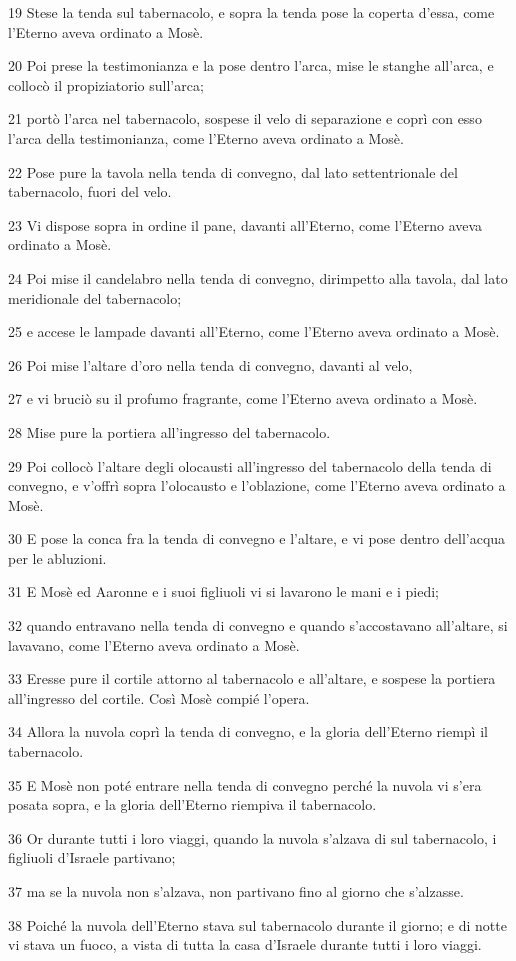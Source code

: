 \par 19 Stese la tenda sul tabernacolo, e sopra la tenda pose la coperta d'essa, come l'Eterno aveva ordinato a Mosè.
\par 20 Poi prese la testimonianza e la pose dentro l'arca, mise le stanghe all'arca, e collocò il propiziatorio sull'arca;
\par 21 portò l'arca nel tabernacolo, sospese il velo di separazione e coprì con esso l'arca della testimonianza, come l'Eterno aveva ordinato a Mosè.
\par 22 Pose pure la tavola nella tenda di convegno, dal lato settentrionale del tabernacolo, fuori del velo.
\par 23 Vi dispose sopra in ordine il pane, davanti all'Eterno, come l'Eterno aveva ordinato a Mosè.
\par 24 Poi mise il candelabro nella tenda di convegno, dirimpetto alla tavola, dal lato meridionale del tabernacolo;
\par 25 e accese le lampade davanti all'Eterno, come l'Eterno aveva ordinato a Mosè.
\par 26 Poi mise l'altare d'oro nella tenda di convegno, davanti al velo,
\par 27 e vi bruciò su il profumo fragrante, come l'Eterno aveva ordinato a Mosè.
\par 28 Mise pure la portiera all'ingresso del tabernacolo.
\par 29 Poi collocò l'altare degli olocausti all'ingresso del tabernacolo della tenda di convegno, e v'offrì sopra l'olocausto e l'oblazione, come l'Eterno aveva ordinato a Mosè.
\par 30 E pose la conca fra la tenda di convegno e l'altare, e vi pose dentro dell'acqua per le abluzioni.
\par 31 E Mosè ed Aaronne e i suoi figliuoli vi si lavarono le mani e i piedi;
\par 32 quando entravano nella tenda di convegno e quando s'accostavano all'altare, si lavavano, come l'Eterno aveva ordinato a Mosè.
\par 33 Eresse pure il cortile attorno al tabernacolo e all'altare, e sospese la portiera all'ingresso del cortile. Così Mosè compié l'opera.
\par 34 Allora la nuvola coprì la tenda di convegno, e la gloria dell'Eterno riempì il tabernacolo.
\par 35 E Mosè non poté entrare nella tenda di convegno perché la nuvola vi s'era posata sopra, e la gloria dell'Eterno riempiva il tabernacolo.
\par 36 Or durante tutti i loro viaggi, quando la nuvola s'alzava di sul tabernacolo, i figliuoli d'Israele partivano;
\par 37 ma se la nuvola non s'alzava, non partivano fino al giorno che s'alzasse.
\par 38 Poiché la nuvola dell'Eterno stava sul tabernacolo durante il giorno; e di notte vi stava un fuoco, a vista di tutta la casa d'Israele durante tutti i loro viaggi.


